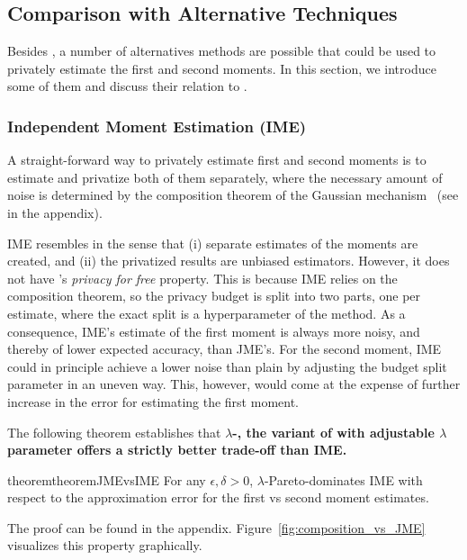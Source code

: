 \subsection{Comparison with Alternative Techniques}
Besides \acronym, a number of alternatives methods are possible that could be used to privately estimate the first and second moments.
%
In this section, we introduce some of them and discuss their relation to \acronym.

\subsubsection{Independent Moment Estimation (IME)} 
A straight-forward way to privately estimate first and second moments is to estimate and privatize both of them separately, where the 
necessary amount of noise is determined by the composition theorem of the Gaussian mechanism~\citep{abadi2016deep} (see  in the appendix).

IME resembles \acronym in the sense that (i) separate estimates of the 
moments are created, and (ii) the privatized results are unbiased 
estimators.
%
However, it does not have \acronym's \emph{privacy for free} property. 
%
This is because IME relies on the composition theorem, so 
the privacy budget is split into two parts, one per estimate, 
where the exact split is a hyperparameter of the method.
%
As a consequence, IME's estimate of the first moment is always more noisy, and thereby of lower expected accuracy, than JME's. 
%
For the second moment, IME could in principle achieve a lower noise than plain \acronym by adjusting the budget split parameter in an uneven way. 
%
This, however, would come at the expense of further increase in the error for estimating  the first moment. 

The following theorem establishes that \textbf{$\lambda$-\acronym, the variant of \acronym with adjustable $\lambda$ parameter offers a strictly better trade-off than IME.} 


\begin{restatable}{theorem}{theoremJMEvsIME}\label{lem:JMEvsIME}
For any $\epsilon,\delta>0$, $\lambda$-\acronym Pareto-dominates IME with 
respect to the approximation error for the first vs second moment estimates.
\end{restatable}

The proof can be found in the appendix. Figure~\ref{fig:composition_vs_JME} visualizes this property graphically. 


